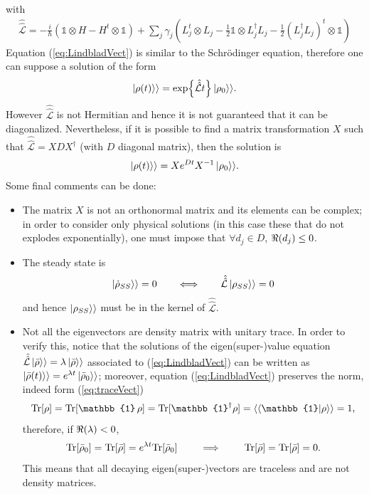 with 
\begin{align}
    \hat{\hat{\mathcal{L}}} = -\frac{i}{\hbar} \left( \mathbb{1} \otimes H - H^t \otimes \mathbb{1} \right) + \sum_j \gamma_j \left( L_j^t \otimes L_j - \frac{1}{2} \mathbb{1} \otimes L_j^\dagger L_j - \frac{1}{2} (L_j^\dagger L_j)^t \otimes \mathbb{1} \right) 
\end{align}
Equation (\ref{eq:LindbladVect}) is similar to the Schr\"odinger equation, therefore one can suppose a solution of the form
\begin{align}
    \ket{\rho(t)}\rangle = \exp{\hat{\hat{\mathcal{L}}}t} \ket{\rho_0}\rangle. 
\end{align}
However $\hat{\hat{\mathcal{L}}}$ is not Hermitian and hence it is not guaranteed that it can be diagonalized. Nevertheless, if it is possible to find a matrix transformation $X$ such that $\hat{\hat{\mathcal{L}}} = X D X^\dagger$ (with $D$ diagonal matrix), then the solution is 
\begin{align}
    \ket{\rho(t)}\rangle = X e^{Dt} X^{-1}\ket{\rho_0}\rangle. 
\end{align}
Some final comments can be done:
\begin{itemize}
    \item The matrix $X$ is not an orthonormal matrix and its elements can be complex; in order to consider only physical solutions (in this case these that do not explodes exponentially), one must impose that $\forall d_j \in D$, $\real{(d_j)} \leq 0$.
    \item The steady state is
    \begin{align*}
        \ket{\dot{\rho}_{SS}}\rangle = 0 \qquad \Longleftrightarrow \qquad \hat{\hat{\mathcal{L}}} \ket{{\rho_{SS}}}\rangle = 0
    \end{align*}
    and hence $\ket{{\rho_{SS}}}\rangle$ must be in the kernel of $\hat{\hat{\mathcal{L}}}$. 
    \item Not all the eigenvectors are density matrix with unitary trace. In order to verify this, notice that the solutions of the eigen(super-)value equation $\hat{\hat{\mathcal{L}}} \ket{\Bar{\rho}}\rangle = \lambda \ket{\Bar{\rho}}\rangle$ associated to (\ref{eq:LindbladVect}) can be written as $\ket{\Bar{\rho}(t)}\rangle = e^{\lambda t} \ket{\Bar{\rho}_0}\rangle$; moreover, equation (\ref{eq:LindbladVect}) preserves the norm, indeed form (\ref{eq:traceVect})
    \begin{align*}
        \text{Tr}[\rho] = \text{Tr}[\mathbb{1} \, \rho] =  \text{Tr}[\mathbb{1}^\dagger \rho] = \langle \braket{\mathbb{1}}{\rho}\rangle = 1,
    \end{align*}
    therefore, if $\real{(\lambda)} < 0$, 
    \begin{align*}
        \text{Tr}[{\Bar{\rho}}_0] = \text{Tr}[\Bar{\rho}] = e^{\lambda t} \text{Tr}[{\Bar{\rho}_0}] \qquad \implies \qquad \text{Tr}[{\Bar{\rho}}] =  \text{Tr}[\Bar{\rho}] = 0.
    \end{align*}
    This means that all decaying eigen(super-)vectors are traceless and are not density matrices. 
\end{itemize}
